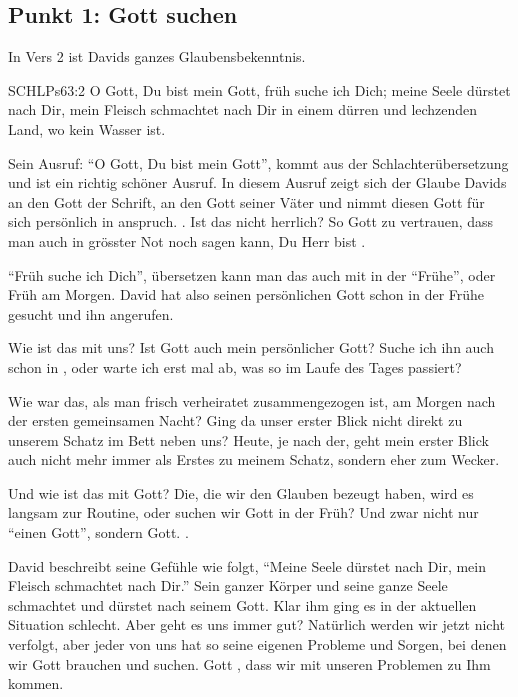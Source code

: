 \documentclass[14pt]{../../inc/mybib}
\begin{document}
    \subsection*{Punkt 1: Gott suchen}
    \begin{block}
    In Vers 2 ist Davids ganzes Glaubensbekenntnis. 
    \begin{bibelbox}{SCHL}{Ps}{63:2}
        O Gott, Du bist mein Gott, früh suche ich Dich; meine Seele dürstet nach Dir, mein Fleisch schmachtet nach Dir in einem dürren und lechzenden Land, wo kein Wasser ist.
    \end{bibelbox}
    Sein Ausruf: \enquote{O Gott, Du bist mein Gott}, kommt aus der Schlachterübersetzung und ist ein richtig schöner Ausruf. In diesem Ausruf zeigt sich der Glaube Davids an den Gott der Schrift, an den Gott seiner Väter und nimmt diesen Gott für sich persönlich in anspruch. . Ist das nicht herrlich? So  Gott zu vertrauen, dass man auch in grösster Not noch sagen kann, Du Herr bist . 

    \enquote{Früh suche ich Dich}, übersetzen kann man das auch mit in der \enquote{Frühe}, oder Früh am Morgen. David hat also seinen persönlichen Gott schon in der Frühe gesucht und ihn angerufen.
    \end{block}

    \begin{block}
        Wie ist das mit uns? Ist Gott auch mein persönlicher Gott? Suche ich ihn auch schon in , oder warte ich erst mal ab, was so im Laufe des Tages passiert?

        Wie war das, als man frisch verheiratet zusammengezogen ist, am Morgen nach der ersten gemeinsamen Nacht? Ging da unser erster Blick nicht direkt zu unserem Schatz im Bett neben uns? Heute, je nach der, geht mein erster Blick auch nicht mehr immer als Erstes zu meinem Schatz, sondern eher zum Wecker.

        Und wie ist das mit  Gott? Die, die wir den Glauben bezeugt haben, wird es langsam zur Routine, oder suchen wir Gott in der Früh? Und zwar nicht nur \enquote{einen Gott}, sondern  Gott. .

        David beschreibt seine Gefühle wie folgt, \enquote{Meine Seele dürstet nach Dir, mein Fleisch schmachtet nach Dir.} Sein ganzer Körper und seine ganze Seele schmachtet und dürstet nach seinem Gott. Klar ihm ging es in der aktuellen Situation schlecht. Aber geht es uns immer gut? Natürlich werden wir jetzt nicht verfolgt, aber jeder von uns hat so seine eigenen Probleme und Sorgen, bei denen wir Gott brauchen und suchen. Gott , dass wir mit unseren Problemen zu Ihm kommen.
    \end{block}
\end{document}
